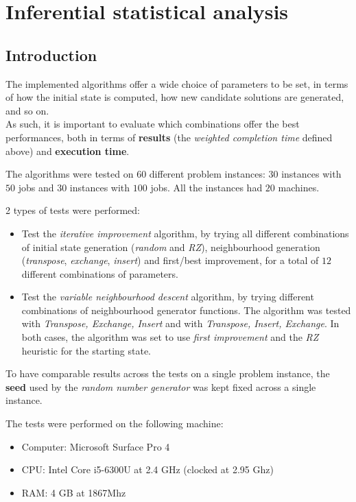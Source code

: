 \documentclass[
12pt,
a4paper,
oneside,
headinclude,
footinclude]{article}
\theoremstyle{definition} %
\begin{document}

\section{Inferential statistical analysis}

\subsection{Introduction}
The implemented algorithms offer a wide choice of parameters to be set, in terms of how the initial state is computed, how new candidate solutions are generated, and so on.\\
As such, it is important to evaluate which combinations offer the best performances, both in terms of \textbf{results} (the \textit{weighted completion time} defined above) and \textbf{execution time}.

The algorithms were tested on $60$ different problem instances: $30$ instances with $50$ jobs and $30$ instances with $100$ jobs.
All the instances had $20$ machines. 

2 types of tests were performed:
\begin{itemize}
    \item Test the \textit{iterative improvement} algorithm, by trying all different combinations of initial state generation (\textit{random} and \textit{RZ}), neighbourhood generation (\textit{transpose}, \textit{exchange}, \textit{insert}) and first/best improvement, for a total of $12$ different combinations of parameters.
    
    \item Test the \textit{variable neighbourhood descent} algorithm, by trying different combinations of neighbourhood generator functions. The algorithm was tested with \textit{Transpose, Exchange, Insert} and with \textit{Transpose, Insert, Exchange}. In both cases, the algorithm was set to use \textit{first improvement} and the \textit{RZ} heuristic for the starting state.
\end{itemize}

To have comparable results across the tests on a single problem instance, the \textbf{seed} used by the \textit{random number generator} was kept fixed across a single instance.

The tests were performed on the following machine:
\begin{itemize}
    \item Computer: Microsoft Surface Pro 4
    \item CPU: Intel Core i5-6300U at 2.4 GHz (clocked at 2.95 Ghz)
    \item RAM: 4 GB at 1867Mhz
\end{itemize}
 
\end{document}
